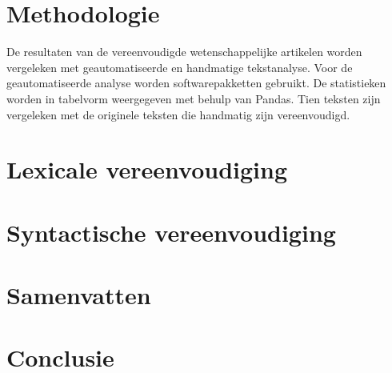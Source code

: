 \section{Methodologie}

De resultaten van de vereenvoudigde wetenschappelijke artikelen worden vergeleken met geautomatiseerde en handmatige tekstanalyse. Voor de geautomatiseerde analyse worden softwarepakketten gebruikt. De statistieken worden in tabelvorm weergegeven met behulp van Pandas. Tien teksten zijn vergeleken met de originele teksten die handmatig zijn vereenvoudigd.

\section{Lexicale vereenvoudiging}



\section{Syntactische vereenvoudiging}

\section{Samenvatten}



\section{Conclusie}

